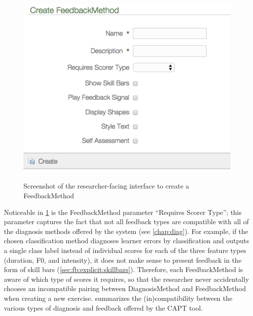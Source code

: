 	\begin{figure}
		\centering
		\caption[Creating a FeedbackMethod]{Screenshot of the researcher-facing interface to create a FeedbackMethod }
		\includegraphics[width=\textwidth]{img/screenshots/createFeedbackMethod}
		\label{fig:fb:createfeedbackmethod}
	\end{figure}
	
	Noticeable in \cref{fig:fb:createfeedbackmethod} is the FeedbackMethod parameter ``Requires Scorer Type''; this parameter captures the fact that not all feedback types are compatible with all of the diagnosis methods offered by the system (see \cref{chap:diag}). For example, if the chosen classification method diagnoses learner errors by classification and outputs a single class label instead of individual scores for each of the three feature types (duration, F0, and intensity), it does not make sense to present feedback in the form of skill bars (\cref{sec:fb:explicit:skillbars}). Therefore, each FeedbackMethod is aware of which type of scores it requires, so that the researcher never accidentally chooses an incompatible pairing between DiagnosisMethod and FeedbackMethod when creating a new exercise.  summarizes the (in)compatibility between the various types of diagnosis and feedback offered by the CAPT tool. 
	

